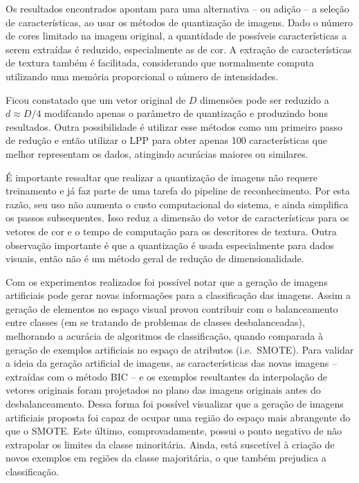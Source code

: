 
%
%
%
%
%
%


Os resultados encontrados apontam para uma alternativa -- ou adição -- a seleção de características, ao usar os métodos de quantização de imagens. Dado o número de cores limitado na imagem original, a quantidade de possíveis características a serem extraídas é reduzido, especialmente as de cor. A extração de características de textura também é facilitada, considerando que normalmente computa utilizando uma memória proporcional o número de intensidades. 

Ficou constatado que um vetor original de $D$ dimensões pode ser reduzido a $d \approx D/4$ modifcando apenas o parâmetro de quantização e produzindo bons resultados. Outra possibilidade é utilizar esse métodos como um primeiro passo de redução e então utilizar o LPP para obter apenas 100 características que melhor representam os dados, atingindo acurácias maiores ou similares.

É importante ressaltar que realizar a quantização de imagens não requere treinamento e já faz parte de uma tarefa do pipeline de reconhecimento. Por esta razão, seu uso não aumenta o custo computacional do sistema, e ainda simplifica os passos subsequentes. Isso reduz a dimensão do vetor de características para os vetores de cor e o tempo de computação para os descritores de textura. Outra observação importante é que a quantização é usada especialmente para dados visuais, então não é um método geral de redução de dimensionalidade.

Com os experimentos realizados foi possível notar que a geração de imagens artificiais pode gerar novas informações para a classificação das imagens. Assim a geração de elementos no espaço visual provou contribuir com o balanceamento entre classes (em se tratando de problemas de classes desbalanceadas), melhorando a acurácia de algoritmos de classificação, quando comparada à geração de exemplos artificiais no espaço de atributos (i.e.\ SMOTE). Para validar a ideia da geração artificial de imagens, as características das novas imagens -- extraídas com o método BIC  -- e os exemplos resultantes da interpolação de vetores originais foram projetados no plano das imagens originais antes do desbalanceamento. Dessa forma foi possível visualizar que a geração de imagens artificiais proposta foi capaz de ocupar uma região do espaço mais abrangente do que o SMOTE. Este último, comprovadamente, possui o ponto negativo de não extrapolar os limites da classe minoritária. Ainda, está suscetível à criação de novos exemplos em regiões da classe majoritária, o que também prejudica a classificação.

